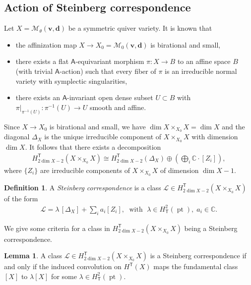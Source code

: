 \documentclass[10pt]{amsart}
\theoremstyle{definition}
\newtheorem{Lemma}[Theorem]{Lemma}
\newtheorem{Definition}[Theorem]{Definition}
\numberwithin{equation}{section}
\newcommand{\bC}{\mathbb{C}}
\newcommand{\bv}{\mathbf{v}}
\newcommand{\bd}{\mathbf{d}}
\newcommand{\cM}{\mathcal{M}}
\newcommand{\sA}{\mathsf{A}}
\newcommand{\sT}{\mathsf{T}}
\newcommand{\pt}{\operatorname{pt}}
\begin{document}
\subsection{Action of Steinberg correspondence}\label{subsec steinberg corr}
Let $X=\cM_\theta(\bv,\bd)$ be a symmetric quiver variety. It is known \cite[Thm.~1.1]{COZZ3} that
\begin{itemize}
    \item the affinization map $X\to X_0=\cM_0(\bv,\bd)$ is birational and small,
    \item there exists a flat $\sA$-equivariant morphism $\pi\colon X\to B$ to an affine space $B$ (with trivial $\sA$-action) such that every fiber of $\pi$ is an irreducible normal variety with symplectic singularities,
    \item there exists an $\sA$-invariant open dense subset $U\subset B$ with $\pi|_{\pi^{-1}(U)}\colon \pi^{-1}(U)\to U$ smooth and affine.
\end{itemize}
Since $X\to X_0$ is birational and small, we have $\dim X\times_{X_0}X=\dim X$ and the diagonal $\Delta_X$ is the unique irreducible component of $X\times_{X_0}X$ with dimension $\dim X$. It follows that there exists a decomposition
\begin{align*}
    H^{\sT}_{2\dim X-2}(X\times_{X_0}X)\cong  H^{\sT}_{2\dim X-2}(\Delta_X)\oplus \left(\bigoplus_i \bC\cdot [Z_i]\right),
\end{align*}
where $\{Z_i\}$ are irreducible components of $X\times_{X_0} X$ of dimension $\dim X-1$.


\begin{Definition}\label{def of Steinberg corr}
A \textit{Steinberg correspondence} is a class $\mathcal L\in H^{\sT}_{2\dim X-2}(X\times_{X_0}X)$ of the form 
\begin{align*}
    \mathcal L=\lambda\,[\Delta_X]+\sum_ia_i[Z_i],\;\text{ with }\; \lambda\in H_\sT^2(\pt),\;a_i\in \bC.
\end{align*}
\end{Definition}

We give some criteria for a class in $H^{\sT}_{2\dim X-2}(X\times_{X_0}X)$ being a Steinberg correspondence.

\begin{Lemma}\label{lem action on [X]}
A class $\mathcal L\in H^{\sT}_{2\dim X-2}(X\times_{X_0}X)$ is a Steinberg correspondence if and only if the induced convolution on $H^\sT(X)$ maps the fundamental class $[X]$ to $\lambda[X]$ for some $\lambda\in H_\sT^2(\pt)$.
\end{Lemma}
\end{document}
